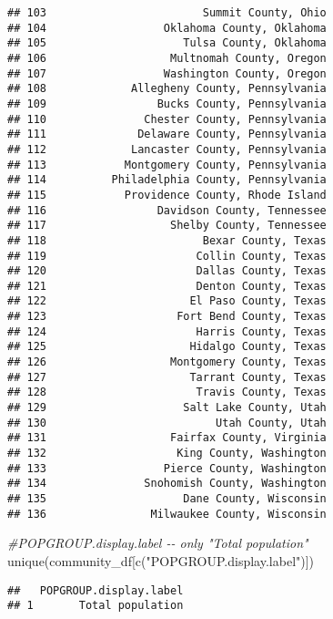 \documentclass[
]{article}
\newenvironment{Shaded}{\begin{snugshade}}{\end{snugshade}}
\newcommand{\CommentTok}[1]{\textcolor[rgb]{0.56,0.35,0.01}{\textit{#1}}}
\newcommand{\FunctionTok}[1]{\textcolor[rgb]{0.00,0.00,0.00}{#1}}
\newcommand{\NormalTok}[1]{#1}
\newcommand{\StringTok}[1]{\textcolor[rgb]{0.31,0.60,0.02}{#1}}
\begin{document}
\begin{verbatim}
## 103                        Summit County, Ohio
## 104                  Oklahoma County, Oklahoma
## 105                     Tulsa County, Oklahoma
## 106                   Multnomah County, Oregon
## 107                  Washington County, Oregon
## 108             Allegheny County, Pennsylvania
## 109                 Bucks County, Pennsylvania
## 110               Chester County, Pennsylvania
## 111              Delaware County, Pennsylvania
## 112             Lancaster County, Pennsylvania
## 113            Montgomery County, Pennsylvania
## 114          Philadelphia County, Pennsylvania
## 115            Providence County, Rhode Island
## 116                 Davidson County, Tennessee
## 117                   Shelby County, Tennessee
## 118                        Bexar County, Texas
## 119                       Collin County, Texas
## 120                       Dallas County, Texas
## 121                       Denton County, Texas
## 122                      El Paso County, Texas
## 123                    Fort Bend County, Texas
## 124                       Harris County, Texas
## 125                      Hidalgo County, Texas
## 126                   Montgomery County, Texas
## 127                      Tarrant County, Texas
## 128                       Travis County, Texas
## 129                     Salt Lake County, Utah
## 130                          Utah County, Utah
## 131                   Fairfax County, Virginia
## 132                    King County, Washington
## 133                  Pierce County, Washington
## 134               Snohomish County, Washington
## 135                     Dane County, Wisconsin
## 136                Milwaukee County, Wisconsin
\end{verbatim}

\begin{Shaded}
\begin{Highlighting}[]
\CommentTok{\#POPGROUP.display.label {-}{-} only "Total population"}
\FunctionTok{unique}\NormalTok{(community\_df[}\FunctionTok{c}\NormalTok{(}\StringTok{"POPGROUP.display.label"}\NormalTok{)])}
\end{Highlighting}
\end{Shaded}

\begin{verbatim}
##   POPGROUP.display.label
## 1       Total population
\end{verbatim}
\end{document}
